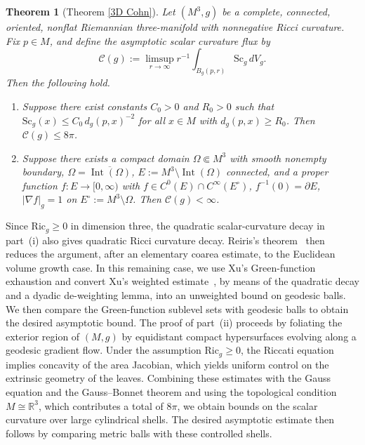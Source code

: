 \documentclass[12pt,oneside,a4paper]{article}
\newtheorem{theoremB}{Theorem}
\theoremstyle{mytheorem}
\theoremstyle{remark}
\begin{document}
\begin{theoremB}[Theorem \ref{3D Cohn}]\label{three-flux}
Let $(M^3,g)$ be a complete, connected, oriented, nonflat Riemannian
three-manifold with nonnegative Ricci curvature.  Fix $p\in M$, and
define the asymptotic scalar curvature flux by
\[
        \mathcal{C}(g)
        :=
        \limsup_{r\to\infty}
        r^{-1}\int_{B_g(p,r)}\mathrm{Sc}_g\,dV_g.
\]
Then the following hold.
\begin{enumerate}
\item[(i)] Suppose there exist constants $C_0>0$ and $R_0>0$ such that 
$\mathrm{Sc}_g(x)\le C_0\,d_g(p,x)^{-2}$ for all $x\in M$ with
$d_g(p,x)\ge R_0$.  Then $\mathcal{C}(g)\le 8\pi$.

\item[(ii)] Suppose there exists a compact domain $\Omega\Subset M^3$
with smooth nonempty boundary, $\Omega=\overline{\operatorname{Int} (\Omega)}$,
$E:=M^3\setminus\operatorname{Int}(\Omega)$ connected, and a proper
function $f:E\to[0,\infty)$ with $f\in C^0(E)\cap C^\infty(E^\circ)$,
$f^{-1}(0)=\partial E$, $|\nabla f|_g=1$ on $E^\circ:=M^3\setminus\Omega$.
Then $\mathcal{C}(g)<\infty$.
\end{enumerate}
\end{theoremB}


Since \(\mathrm{Ric}_g\ge 0\) in dimension three, the quadratic
scalar-curvature decay in part~(i) also gives quadratic Ricci curvature
decay. Reiris's theorem~\cite[Corollary~1.1]{zbMATH06423474} then
reduces the argument, after an elementary coarea estimate, to the
Euclidean volume growth case. In this remaining case, we use Xu's
Green-function exhaustion and convert Xu's weighted
estimate~\cite[Theorem~1.2]{zbMATH07177335}, by means of the quadratic
decay and a dyadic de-weighting lemma, into an unweighted bound on
geodesic balls.  We then compare the Green-function sublevel sets with geodesic balls to obtain  the desired asymptotic bound.
  The proof of part~(ii) proceeds by foliating the
exterior region of $(M,g)$ by equidistant compact hypersurfaces
evolving along a geodesic gradient flow.  Under the assumption
$\mathrm{Ric}_g\ge 0$, the Riccati equation implies concavity of the
area Jacobian, which yields uniform control on the extrinsic geometry
of the leaves.  Combining these estimates with the Gauss equation and
the Gauss--Bonnet theorem and using the topological condition
$M\cong\mathbb{R}^3$, which contributes a total of $8\pi$, we obtain
bounds on the scalar curvature over large cylindrical shells.  The
desired asymptotic estimate then follows by comparing metric balls with
these controlled shells.
\end{document}
